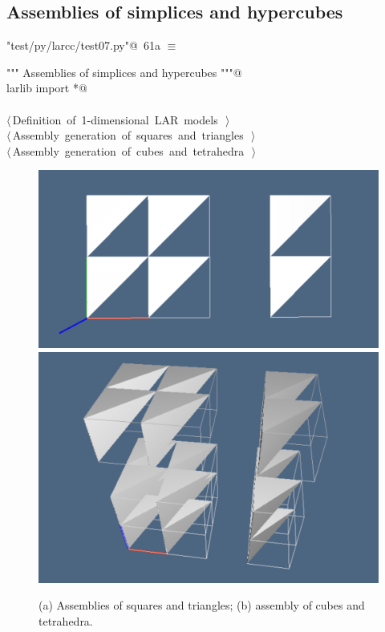 \documentclass[11pt,oneside]{article}	%
\begin{document}
\subsection{Assemblies of simplices and hypercubes}

\begin{flushleft} \small \label{scrap118}
\protect{}\verb@"test/py/larcc/test07.py"@\nobreak\ {\footnotesize 61a }$\equiv$
\vspace{-1ex}
\begin{list}{}{} \item
\mbox{}\verb@""" Assemblies of simplices and hypercubes """@\\
\mbox{}\verb@from larlib import *@\\
\mbox{}\verb@@\\
\mbox{}\verb@@\hbox{$\langle\,$Definition of 1-dimensional LAR models\nobreak\ {\footnotesize {}}$\,\rangle$}\verb@@\\
\mbox{}\verb@@\hbox{$\langle\,$Assembly generation of squares and triangles\nobreak\ {\footnotesize {}}$\,\rangle$}\verb@@\\
\mbox{}\verb@@\hbox{$\langle\,$Assembly generation of cubes and tetrahedra\nobreak\ {\footnotesize {}}$\,\rangle$}\verb@@\\
\mbox{}\verb@@{\NWsep}
\end{list}
\vspace{-2ex}
\end{flushleft}

\begin{figure}[htbp] %
   \centering
   \includegraphics[width=0.405\linewidth]{images/assembly1} 
   \includegraphics[width=0.315\linewidth]{images/assembly2} 
   \caption{(a) Assemblies of squares and triangles; (b) assembly of cubes and tetrahedra.}
   \label{fig:example}
\end{figure}
\end{document}

